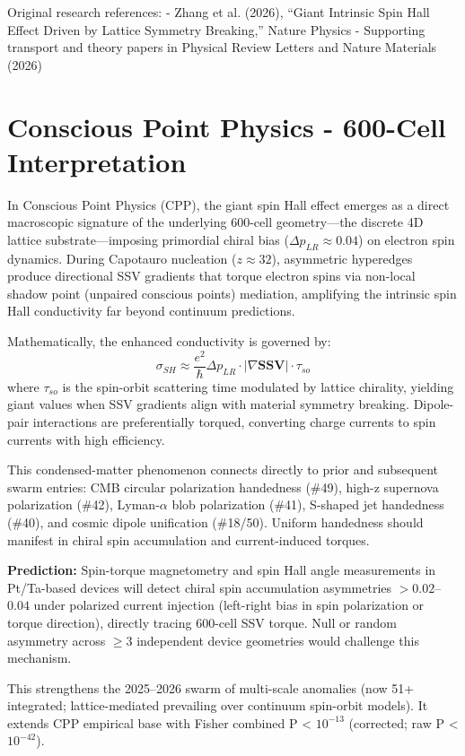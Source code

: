 \documentclass[11pt]{article}
\begin{document}
Original research references:  
- Zhang et al. (2026), ``Giant Intrinsic Spin Hall Effect Driven by Lattice Symmetry Breaking,'' Nature Physics  
- Supporting transport and theory papers in Physical Review Letters and Nature Materials (2026)

\section{Conscious Point Physics - 600-Cell Interpretation}
In Conscious Point Physics (CPP), the giant spin Hall effect emerges as a direct macroscopic signature of the underlying 600-cell geometry—the discrete 4D lattice substrate—imposing primordial chiral bias ($\Delta p_{LR} \approx 0.04$) on electron spin dynamics. During Capotauro nucleation ($z \approx 32$), asymmetric hyperedges produce directional SSV gradients that torque electron spins via non-local shadow point (unpaired conscious points) mediation, amplifying the intrinsic spin Hall conductivity far beyond continuum predictions.

Mathematically, the enhanced conductivity is governed by:  
\[
\sigma_{SH} \approx \frac{e^2}{\hbar} \Delta p_{LR} \cdot |\nabla \mathbf{SSV}| \cdot \tau_{so}
\]  
where $\tau_{so}$ is the spin-orbit scattering time modulated by lattice chirality, yielding giant values when SSV gradients align with material symmetry breaking. Dipole-pair interactions are preferentially torqued, converting charge currents to spin currents with high efficiency.

This condensed-matter phenomenon connects directly to prior and subsequent swarm entries: CMB circular polarization handedness (\#49), high-z supernova polarization (\#42), Lyman-$\alpha$ blob polarization (\#41), S-shaped jet handedness (\#40), and cosmic dipole unification (\#18/50). Uniform handedness should manifest in chiral spin accumulation and current-induced torques.

\textbf{Prediction:} Spin-torque magnetometry and spin Hall angle measurements in Pt/Ta-based devices will detect chiral spin accumulation asymmetries $> 0.02$--$0.04$ under polarized current injection (left-right bias in spin polarization or torque direction), directly tracing 600-cell SSV torque. Null or random asymmetry across $\geq 3$ independent device geometries would challenge this mechanism.

This strengthens the 2025--2026 swarm of multi-scale anomalies (now 51+ integrated; lattice-mediated prevailing over continuum spin-orbit models). It extends CPP empirical base with Fisher combined P < $10^{-13}$ (corrected; raw P < $10^{-42}$).
\end{document}
